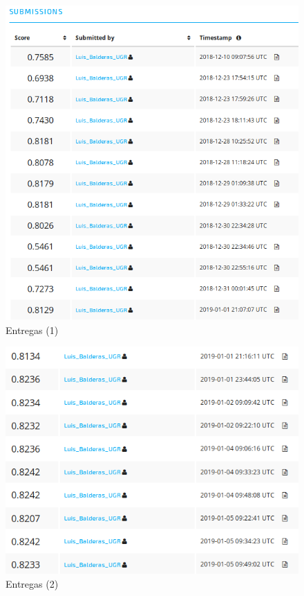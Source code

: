 	
\begin{figure}[H] %
	\centering
	\includegraphics[scale=0.5]{sub1.png}  %
	\caption{Entregas (1)} 
	\label{fig:sub1}
\end{figure}
	
	
\begin{figure}[H] %
	\centering
	\includegraphics[scale=0.5]{sub2.png}  %
	\caption{Entregas (2)} 
	\label{fig:sub2}
\end{figure}

